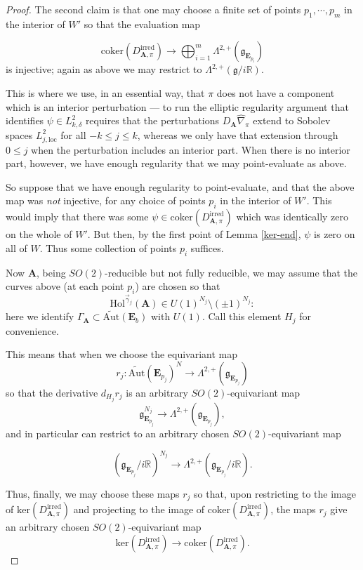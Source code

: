 \documentclass{memo-l}
\theoremstyle{definition}
\theoremstyle{remark}
\numberwithin{section}{chapter}
\numberwithin{equation}{chapter}
\begin{document}
\begin{proof}
The second claim is that one may choose a finite set of points $p_1, \cdots, p_m$ in the interior of $W'$ so that the evaluation map

$$\text{coker}(D^{\text{irred}}_{\mathbf{A},\pi}) \to \bigoplus_{i=1}^m \Lambda^{2,+}(\mathfrak g_{\mathbf{E}_{p_i}})$$
is injective; again as above we may restrict to $\Lambda^{2,+}(\mathfrak g/i\mathbb R)$.

This is where we use, in an essential way, that $\pi$ does not have a component which is an interior perturbation --- to run the elliptic regularity argument that identifies $\psi \in L^2_{k,\delta}$ requires that the perturbations $D_{\mathbf{A}}\widehat{\nabla}_\pi$ extend to Sobolev spaces $L^2_{j,\text{loc}}$ for all $-k \leq j \leq k$, whereas we only have that extension through $0 \leq j$ when the perturbation includes an interior part. When there is no interior part, however, we have enough regularity that we may point-evaluate as above.

So suppose that we have enough regularity to point-evaluate, and that the above map was \emph{not} injective, for any choice of points $p_i$ in the interior of $W'$. This would imply that there was some $\psi \in \text{coker}(D^{\text{irred}}_{\mathbf{A},\pi})$ which was identically zero on the whole of $W'$. But then, by the first point of Lemma \ref{ker-end}, $\psi$ is zero on all of $W$. Thus some collection of points $p_i$ suffices.

Now $\mathbf{A}$, being $SO(2)$-reducible but not fully reducible, we may assume that the curves above (at each point $p_i$) are chosen so that
$$\text{Hol}^{\vec \gamma_j}(\mathbf{A}) \in U(1)^{N_j} \setminus (\pm 1)^{N_j}:$$
here we identify $\Gamma_{\mathbf{A}} \subset \widetilde{\text{Aut}}(\mathbf{E}_b)$ with $U(1)$. Call this element $H_j$ for convenience.

This means that when we choose the equivariant map
$$r_j: \widetilde{\text{Aut}}(\mathbf{E}_{p_j})^N \to \Lambda^{2,+}\left(\mathfrak g_{\mathbf{E}_{p_j}}\right)$$
so that the derivative $d_{H_j} r_j$ is an arbitrary $SO(2)$-equivariant map
$$\mathfrak{g}_{\mathbf{E}_{p_j}}^{N_j} \to \Lambda^{2,+}\left(\mathfrak g_{\mathbf{E}_{p_j}}\right),$$
and in particular can restrict to an arbitrary chosen $SO(2)$-equivariant map

$$\left(\mathfrak g_{\mathbf{E}_{p_j}}/i\mathbb R\right)^{N_j} \to \Lambda^{2,+}\left(\mathfrak g_{\mathbf{E}_{p_j}}/i\mathbb R\right).$$

Thus, finally, we may choose these maps $r_j$ so that, upon restricting to the image of $\text{ker}(D^{\text{irred}}_{\mathbf{A},\pi})$ and projecting to the image of $\text{coker}(D^{\text{irred}}_{\mathbf{A},\pi})$, the maps $r_j$ give an arbitrary chosen $SO(2)$-equivariant map
$$\text{ker}(D^{\text{irred}}_{\mathbf{A},\pi})\to \text{coker}(D^{\text{irred}}_{\mathbf{A},\pi}).$$


\end{proof}
\end{document}
